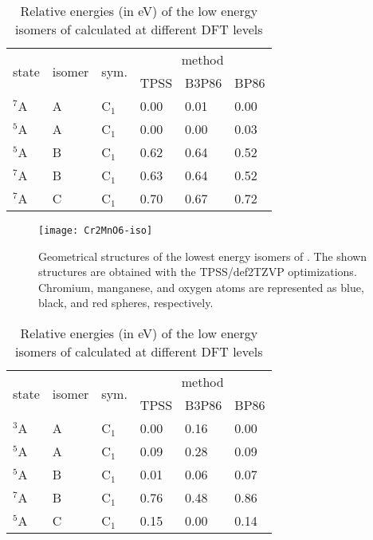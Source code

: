 \begin{table}[]
	\centering
	\caption{Relative energies (in eV) of the low energy isomers of  calculated at different DFT levels}
\begin{tabular}{@{}llllll@{}}
\toprule
\multirow{2}{*}{state} & \multirow{2}{*}{isomer} & \multirow{2}{*}{sym.} & \multicolumn{3}{c}{method} \\ \cmidrule(l){4-6} 
         &        &         & TPSS   & B3P86 & BP86   \\ \midrule
$^7$A    & A      & C$_1$   & 0.00   & 0.01  & 0.00 \\
$^5$A    & A      & C$_1$   & 0.00   & 0.00  & 0.03 \\
$^5$A    & B      & C$_1$   & 0.62   & 0.64  & 0.52 \\
$^7$A    & B      & C$_1$   & 0.63   & 0.64  & 0.52 \\
$^7$A    & C      & C$_1$   & 0.70   & 0.67  & 0.72 \\ \bottomrule
\end{tabular}
\label{tbl:Cr2MnO6}
\end{table}	



\begin{figure}
	\centering
	\texttt{[image: Cr2MnO6-iso]}
	\caption{Geometrical structures of the lowest energy isomers of . The shown structures are obtained with the TPSS/def2TZVP optimizations. Chromium, manganese, and oxygen atoms are represented as blue, black, and red spheres, respectively.}
	\label{figs:Cr2MnO6}
\end{figure}




\begin{table}[]
	\centering
	\caption{Relative energies (in eV) of the low energy isomers of  calculated at different DFT levels}
\begin{tabular}{@{}llllll@{}}
\toprule
\multirow{2}{*}{state} & \multirow{2}{*}{isomer} & \multirow{2}{*}{sym.} & \multicolumn{3}{c}{method} \\ \cmidrule(l){4-6} 
         &        &         & TPSS   & B3P86 & BP86   \\ \midrule
$^3$A    & A      & C$_1$   & 0.00   & 0.16  & 0.00 \\
$^5$A    & A      & C$_1$   & 0.09   & 0.28  & 0.09 \\
$^5$A    & B      & C$_1$   & 0.01   & 0.06  & 0.07 \\
$^7$A    & B      & C$_1$   & 0.76   & 0.48  & 0.86 \\
$^5$A    & C      & C$_1$   & 0.15   & 0.00  & 0.14 \\ \bottomrule
\end{tabular}
\label{tbl:Cr2MnO7}
\end{table}	



